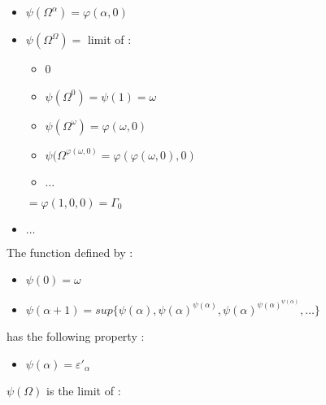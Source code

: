 \documentclass[10pt]{article}
\begin{document}
\begin{itemize}
\item \( \psi(\Omega^\alpha) = \varphi(\alpha,0) \)

\item \( \psi(\Omega^\Omega) = \) limit of :
   \begin{itemize}
     \setlength{\itemsep}{1pt}
     \setlength{\parskip}{0pt}
     \setlength{\parsep}{0pt}
   \item 0
   \item \( \psi(\Omega^0) = \psi(1) = \omega \)
   \item \( \psi(\Omega^\omega) = \varphi(\omega,0) \)
   \item \( \psi(\Omega^{\varphi(\omega,0)} = \varphi(\varphi(\omega,0),0) \)
   \item \( \ldots \) 
   \end{itemize}
   \( = \varphi(1,0,0) = \Gamma_0 \)

\item \( \ldots \)

\end{itemize}

\bigskip

The function defined by :

\begin{itemize}
     \setlength{\itemsep}{1pt}
     \setlength{\parskip}{0pt}
     \setlength{\parsep}{0pt}
\item \( \psi(0) = \omega \)
\item \( \psi(\alpha+1) = sup \lbrace \psi(\alpha), \psi(\alpha)^{\psi(\alpha)}, \psi(\alpha)^{\psi(\alpha)^{\psi(\alpha)}}, \ldots \rbrace \)
\end{itemize}

has the following property :

\begin{itemize}
     \setlength{\itemsep}{1pt}
     \setlength{\parskip}{0pt}
     \setlength{\parsep}{0pt}
\item \( \psi(\alpha) = \varepsilon'_\alpha \)
\end{itemize}

\( \psi(\Omega) \) is the limit of :
\end{document}

